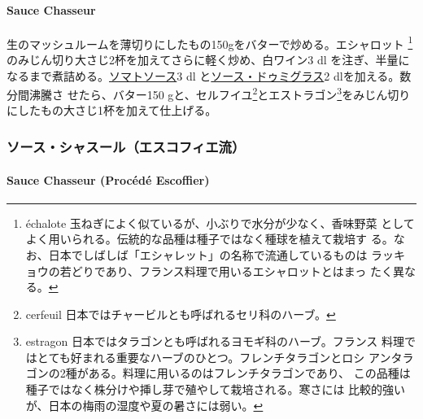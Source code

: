 \begin{recette}
\hypertarget{sauce-chasseur}{%
\paragraph{Sauce Chasseur}\label{sauce-chasseur}}

  

生のマッシュルームを薄切りにしたもの150gをバターで炒める。エシャロット
\footnote{échalote
  玉ねぎによく似ているが、小ぶりで水分が少なく、香味野菜
  としてよく用いられる。伝統的な品種は種子ではなく種球を植えて栽培す
  る。なお、日本でしばしば「エシャレット」の名称で流通しているものは
  ラッキョウの若どりであり、フランス料理で用いるエシャロットとはまっ
  たく異なる。}のみじん切り大さじ2\undemi{}杯を加えてさらに軽く炒め、白ワイン3
dl
を注ぎ、半量になるまで煮詰める。\protect\hyperlink{sauce-tomate}{ソマトソース}3
dl と\protect\hyperlink{sauce-demi-glace}{ソース・ドゥミグラス}2
dlを加える。数分間沸騰さ せたら、バター150 gと、セルフイユ\footnote{cerfeuil
  日本ではチャービルとも呼ばれるセリ科のハーブ。}とエストラゴン\footnote{estragon
  日本ではタラゴンとも呼ばれるヨモギ科のハーブ。フランス
  料理ではとても好まれる重要なハーブのひとつ。フレンチタラゴンとロシ
  アンタラゴンの2種がある。料理に用いるのはフレンチタラゴンであり、
  この品種は種子ではなく株分けや挿し芽で殖やして栽培される。寒さには
  比較的強いが、日本の梅雨の湿度や夏の暑さには弱い。}をみじん切り
にしたもの大さじ1\undemi{}杯を加えて仕上げる。

\maeaki

\hypertarget{ux30bdux30fcux30b9ux30b7ux30e3ux30b9ux30fcux30ebux30a8ux30b9ux30b3ux30d5ux30a3ux30a8ux6d41}{%
\subsubsection{ソース・シャスール（エスコフィエ流）}\label{ux30bdux30fcux30b9ux30b7ux30e3ux30b9ux30fcux30ebux30a8ux30b9ux30b3ux30d5ux30a3ux30a8ux6d41}}

\hypertarget{sauce-chasseur-procede-escoffier}{%
\paragraph{Sauce Chasseur (Procédé
Escoffier)}\label{sauce-chasseur-procede-escoffier}}

   


\end{recette}
